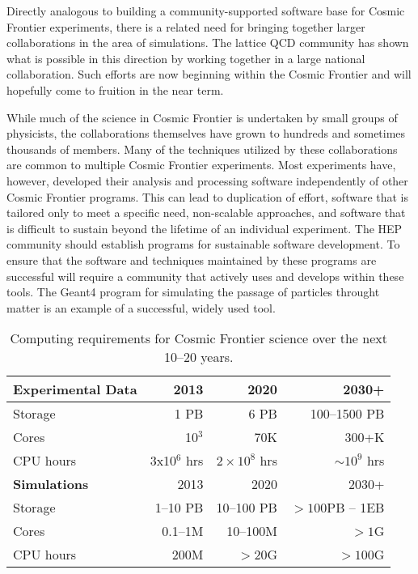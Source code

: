 Directly analogous to building a community-supported
software base for Cosmic Frontier experiments, there is a related need
for bringing together larger collaborations in the area of
simulations. The lattice QCD community has shown what is possible in this
direction by working together in a large national collaboration. Such
efforts are now beginning within the Cosmic Frontier and will
hopefully come to fruition in the near term.


While much of the science in Cosmic Frontier is undertaken by small
groups of physicists, the collaborations themselves have grown to
hundreds and sometimes thousands of members. Many of the techniques
utilized by these collaborations are common to multiple Cosmic Frontier 
experiments. Most experiments have, however, developed their
analysis and processing software independently of other Cosmic Frontier 
programs. This can lead to duplication of effort, software
that is tailored only to meet a specific need, non-scalable
approaches, and software that is difficult to sustain beyond the
lifetime of an individual experiment. 
The HEP community should establish programs for sustainable software
development.
To ensure that the software and
techniques maintained by these programs are successful will require a
community that actively uses and develops within these tools.
The Geant4 program for simulating the passage of
particles throught matter is an example of a successful, widely used tool.


\begin{center}
\begin{table}
\begin{centering}
\caption{Computing requirements for Cosmic Frontier science over the next
 10--20 years.}
\begin{tabular}{|l|r|r|r|} 
 \hline 
{\bf Experimental Data} & 2013 & 2020 & 2030+ \\
\hline
Storage & 1 PB & 6 PB & 100--1500 PB \\
Cores & 10$^3$ & 70K & 300+K \\
CPU hours & 3x10$^6$ hrs & $2\times 10^8$ hrs & $\sim 10^9$ hrs \\
 \hline 
{\bf Simulations} &2013 & 2020 & 2030+ \\
 \hline 
Storage & 1--10 PB & 10--100 PB & $> 100 $PB -- 1EB\\
Cores & 0.1--1M & 10--100M &$> 1$G\\
CPU hours & 200M & $>$20G & $> 100$G\\
\hline
\end{tabular}
\end{centering}
\label{tab:CosmicCompNeeds}
\end{table}
\end{center}

